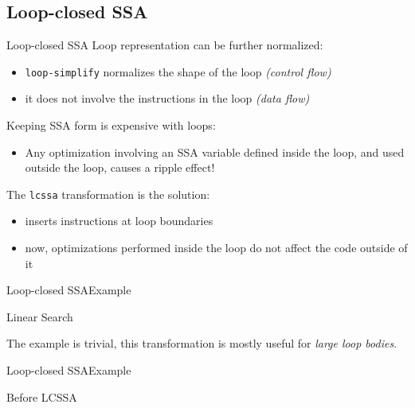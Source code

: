 \subsection{Loop-closed SSA}


\begin{frame}{Loop-closed SSA}
Loop representation can be further normalized:

\begin{itemize}
\item \texttt{loop-simplify} normalizes the \alert{shape} of the loop \emph{(control flow)}
\item it does not involve the instructions in the loop \emph{(data flow)}
\end{itemize}

\vfill
Keeping SSA form is expensive with loops:
\begin{itemize}
\item Any optimization involving an SSA variable \alert{defined inside the loop}, and \alert{used
outside the loop}, causes a ripple effect!
\end{itemize}
\vfill
The \texttt{lcssa} transformation is the solution:
\begin{itemize}
\item inserts  instructions at loop boundaries
\item now, optimizations performed inside the loop do not affect the code outside of it
\end{itemize}
\end{frame}


\begin{frame}{Loop-closed SSA}{Example}
\begin{block}{Linear Search}
\centering
{}
\end{block}

\vfill
\begin{center}
The example is trivial, this transformation is mostly useful for \emph{large loop bodies}.
\end{center}
\end{frame}


\begin{frame}{Loop-closed SSA}{Example}
\begin{block}{Before LCSSA}
\centering
{}
\end{block}
\vspace{\baselineskip}
\vfill
\end{frame}


